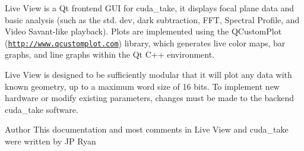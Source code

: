 Live View is a Qt frontend G\+U\+I for cuda\+\_\+take, it displays focal plane data and basic analysis (such as the std. dev, dark subtraction, F\+F\+T, Spectral Profile, and Video Savant-\/like playback). Plots are implemented using the Q\+Custom\+Plot (\href{http://www.qcustomplot.com}{\tt http\+://www.\+qcustomplot.\+com}) library, which generates live color maps, bar graphs, and line graphs within the Qt C++ environment. 

Live View is designed to be sufficiently modular that it will plot any data with known geometry, up to a maximum word size of 16 bits. To implement new hardware or modify existing parameters, changes must be made to the backend cuda\+\_\+take software.

\begin{DoxyAuthor}{Author}
This documentation and most comments in Live View and cuda\+\_\+take were written by J\+P Ryan 
\end{DoxyAuthor}
